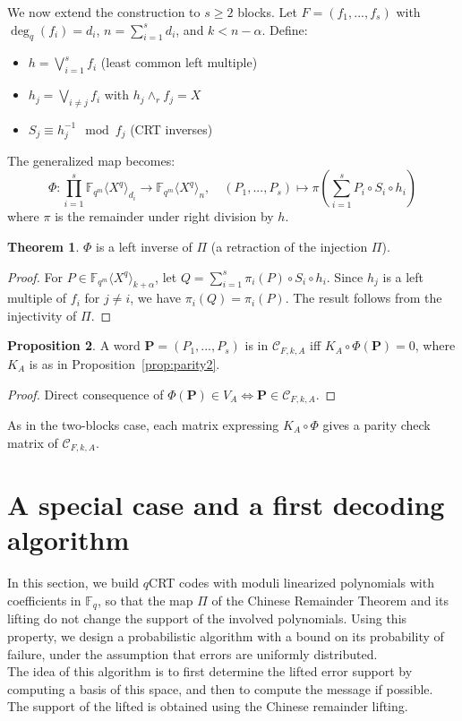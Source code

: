 \documentclass{article}
\newcommand{\QP}{\mathbb{F}_{q^m} \langle X^q \rangle}
\theoremstyle{definition}
\newtheorem{theorem}{Theorem}
\newtheorem{proposition}[theorem]{Proposition}
\begin{document}
We now extend the construction to $s \geq 2$ blocks. Let $F = (f_1,...,f_s)$ with $\deg_q(f_i) = d_i$, $n = \sum_{i=1}^s d_i$, and $k < n - \alpha$. Define:

\begin{itemize}
      \item $h = \bigvee_{i=1}^s f_i$ (least common left multiple)
      \item $h_j = \bigvee_{i \neq j} f_i$ with $h_j \wedge_r f_j = X$
      \item $S_j \equiv h_j^{-1} \mod f_j$ (CRT inverses)
\end{itemize}

The generalized map becomes:
\[
      \Phi : \prod_{i=1}^s \QP_{d_i} \to \QP_{n}, \quad
      (P_1,...,P_s) \mapsto \pi\left( \sum_{i=1}^s P_i \circ S_i \circ h_i \right)
\]
where $\pi$ is the remainder under right division by $h$.

\begin{theorem}
      $\Phi$ is a left inverse of $\Pi$ (a retraction of the injection $\Pi$).
\end{theorem}

\begin{proof}
      For $P \in \QP_{k+\alpha}$, let $Q = \sum_{i=1}^s \pi_i(P) \circ S_i \circ h_i$. Since $h_j$ is a left multiple of $f_i$ for $j \neq i$, we have $\pi_i(Q) = \pi_i(P)$. The result follows from the injectivity of $\Pi$.
\end{proof}

\begin{proposition}
      \label{prop:parity}
      A word $\mathbf{P} = (P_1,...,P_s)$ is in $\mathcal{C}_{F,k,A}$ iff $K_A \circ \Phi(\mathbf{P}) = 0$, where $K_A$ is as in Proposition~\ref{prop:parity2}.
\end{proposition}

\begin{proof}
      Direct consequence of $\Phi(\mathbf{P}) \in V_A \Leftrightarrow \mathbf{P} \in \mathcal{C}_{F,k,A}$.
\end{proof}

\noindent As in the two-blocks case, each matrix expressing $K_A \circ \Phi$ gives a parity check matrix of  $\mathcal{C}_{F,k,A}$.

\section{A special case and a first decoding algorithm} \label{simpdecod}

In this section, we build $q$CRT codes with moduli linearized polynomials with coefficients in $\mathbb{F}_q$, so that the
map $\Pi$ of the Chinese Remainder Theorem and its lifting do not change the
support of the involved polynomials. Using this property, we design a probabilistic algorithm with a bound on its probability of failure, under the assumption that errors are uniformly distributed. \color{black}\\
The idea of this algorithm is to first determine the lifted
error support by computing a basis of this space, and then to compute the message if possible. The
support of the lifted is obtained using the Chinese remainder lifting. \\
\end{document}
